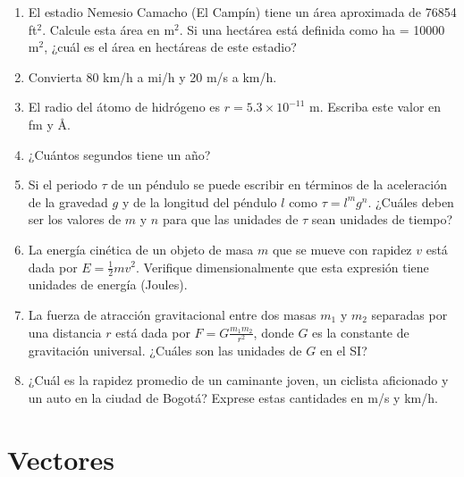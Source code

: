 \documentclass[11pt, letterpaper]{article}
\begin{document}
    \begin{enumerate}
    	
    	\item El estadio Nemesio Camacho (El Campín) tiene un área aproximada de 76854 ft$^2$. Calcule esta área en m$^2$. Si una hectárea está definida como ha = 10000 m$^2$, ¿cuál es el área en hectáreas de este estadio?
    	
    	\item Convierta 80 km/h a mi/h y 20 m/s a km/h.
    	
    	\item El radio del átomo de hidrógeno es $r = 5.3 \times 10^{-11}$ m. Escriba este valor en fm y \AA.
    	
    	\item ¿Cuántos segundos tiene un año?
    	
    	\item Si el periodo $\tau$ de un péndulo se puede escribir en términos de la aceleración de la gravedad $g$ y de la longitud del péndulo $l$ como $\tau = l^m g^n$. ¿Cuáles deben ser los valores de $m$ y $n$ para que las unidades de $\tau$ sean unidades de tiempo?
    	
    	\item La energía cinética de un objeto de masa $m$ que se mueve con rapidez $v$ está dada por $E = \frac{1}{2}mv^2$. Verifique dimensionalmente que esta expresión tiene unidades de energía (Joules).
    	
    	\item La fuerza de atracción gravitacional entre dos masas $m_1$ y $m_2$ separadas por una distancia $r$ está dada por $F = G\frac{m_1 m_2}{r^2}$, donde $G$ es la constante de gravitación universal. ¿Cuáles son las unidades de $G$ en el SI?
    	
    	\item ¿Cuál es la rapidez promedio de un caminante joven, un ciclista aficionado y un auto en la ciudad de Bogotá? Exprese estas cantidades en m/s y km/h.
    	
    \end{enumerate}
    
   \section{Vectores}
   
\end{document}
